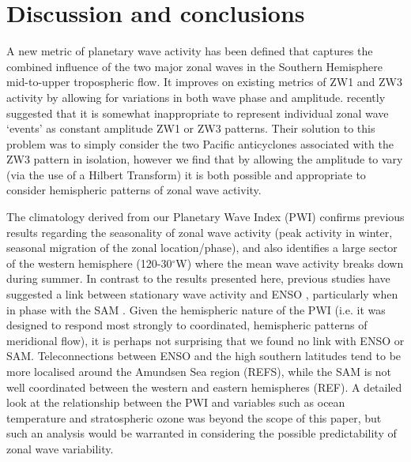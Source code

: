 \section{Discussion and conclusions}

A new metric of planetary wave activity has been defined that captures the combined influence of the two major zonal waves in the Southern Hemisphere mid-to-upper tropospheric flow. It improves on existing metrics of ZW1 and ZW3 activity by allowing for variations in both wave phase and amplitude. \citet{Hobbs2010} recently suggested that it is somewhat inappropriate to represent individual zonal wave `events' as constant amplitude ZW1 or ZW3 patterns. Their solution to this problem was to simply consider the two Pacific anticyclones associated with the ZW3 pattern in isolation, however we find that by allowing the amplitude to vary (via the use of a Hilbert Transform) it is both possible and appropriate to consider hemispheric patterns of zonal wave activity.  

The climatology derived from our Planetary Wave Index (PWI) confirms previous results regarding the seasonality of zonal wave activity (peak activity in winter, seasonal migration of the zonal location/phase), and also identifies a large sector of the western hemisphere (120-30$^{\circ}$W) where the mean wave activity breaks down during summer. In contrast to the results presented here, previous studies have suggested a link between stationary wave activity and ENSO \citep[e.g.][]{Trenberth1980,Raphael2003,Hobbs2007}, particularly when in phase with the SAM \citep{Pezza2012}. Given the hemispheric nature of the PWI (i.e. it was designed to respond most strongly to coordinated, hemispheric patterns of meridional flow), it is perhaps not surprising that we found no link with ENSO or SAM. Teleconnections between ENSO and the high southern latitudes tend to be more localised around the Amundsen Sea region (REFS), while the SAM is not well coordinated between the western and eastern hemispheres (REF). A detailed look at the relationship between the PWI and variables such as ocean temperature and stratospheric ozone was beyond the scope of this paper, but such an analysis would be warranted in considering the possible predictability of zonal wave variability.

